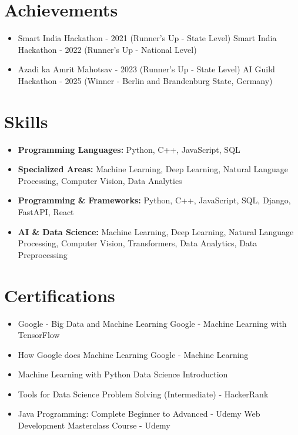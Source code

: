 \documentclass[a4paper,10pt]{article}
\begin{document}
\section*{Achievements}
\begin{itemize}
\item Smart India Hackathon - 2021 (Runner's Up - State Level) \hfill Smart India Hackathon - 2022 (Runner's Up - National Level)
\item Azadi ka Amrit Mahotsav - 2023 (Runner's Up - State Level) \hfill AI Guild Hackathon - 2025 (Winner - Berlin and Brandenburg State, Germany)
\end{itemize}

\section*{Skills}
\begin{itemize}
  \item \textbf{Programming Languages:} Python, C++, JavaScript, SQL
  \item \textbf{Specialized Areas:} Machine Learning, Deep Learning, Natural Language Processing, Computer Vision, Data Analytics
  \item \textbf{Programming \& Frameworks:} Python, C++, JavaScript, SQL, Django, FastAPI, React
  \item \textbf{AI \& Data Science:} Machine Learning, Deep Learning, Natural Language Processing, Computer Vision, Transformers, Data Analytics, Data Preprocessing
\end{itemize}

\section*{Certifications}
\begin{itemize}
\item Google - Big Data and Machine Learning \hfill Google - Machine Learning with TensorFlow
\item How Google does Machine Learning \hfill Google - Machine Learning
\item Machine Learning with Python \hfill Data Science Introduction
\item Tools for Data Science \hfill Problem Solving (Intermediate) - HackerRank
\item Java Programming: Complete Beginner to Advanced - Udemy \hfill Web Development Masterclass Course - Udemy
\end{itemize}
\end{document}
